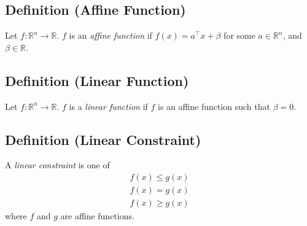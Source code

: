 \subsection{Definition (Affine Function)}
Let $f:\mathbb{R}^n\rightarrow\mathbb{R}$. $f$ is an \emph{affine function} if
$f(x)=a^\top x+\beta$ for some $a\in\mathbb{R}^n$, and $\beta\in\mathbb{R}$.

\subsection{Definition (Linear Function)}
Let $f:\mathbb{R}^n\rightarrow\mathbb{R}$. $f$ is a \emph{linear function} if
$f$ is an affine function such that $\beta=0$.

\subsection{Definition (Linear Constraint)}
A \emph{linear constraint} is one of
\begin{align*}
    f(x)\le g(x)\\
    f(x)=g(x)\\
    f(x)\ge g(x)
\end{align*}
where $f$ and $g$ are affine functions.